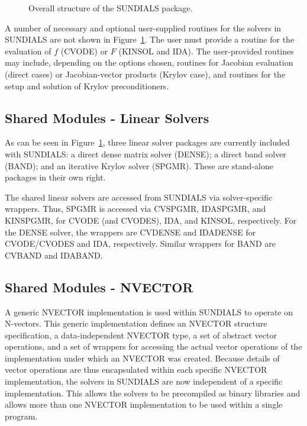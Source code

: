\begin{figure}[tp]
\centerline{}
\caption{Overall structure of the SUNDIALS  package.}
\label{fig-sunorg}
\end{figure}

A number of necessary and optional user-supplied routines for the solvers
in SUNDIALS
are not shown in \mbox{Figure \ref{fig-sunorg}}. The user must
provide a routine for the evaluation of $f$ (CVODE) or $F$ (KINSOL and
IDA). The user-provided routines may include, depending on the options
chosen, routines for Jacobian evaluation (direct cases) or Jacobian-vector
products (Krylov case), and routines for the setup and solution of Krylov
preconditioners.


\subsection{Shared Modules - Linear Solvers}

As can be seen in \mbox{Figure \ref{fig-sunorg}}, three linear solver
packages are currently included with SUNDIALS: a direct dense matrix solver
(DENSE); a direct band solver (BAND); and an iterative Krylov solver
(SPGMR). These are stand-alone packages in their own right.

The shared linear solvers are accessed from SUNDIALS via
solver-specific wrappers.
Thus, SPGMR is accessed via CVSPGMR, IDASPGMR, and
KINSPGMR, for CVODE (and CVODES), IDA, and KINSOL, respectively. For the
DENSE solver, the wrappers are CVDENSE and IDADENSE for CVODE/CVODES and
IDA, respectively. Similar wrappers for BAND are CVBAND and IDABAND.

\subsection{Shared Modules - NVECTOR}

A generic NVECTOR implementation is used within SUNDIALS to
operate on N-vectors. This generic implementation defines an NVECTOR
structure specification, a data-independent NVECTOR type, a set of abstract
vector operations, and a set of wrappers for accessing the actual vector
operations of the implementation under which an NVECTOR was created. Because
details of vector operations are thus encapsulated within each specific
NVECTOR implementation, the solvers in SUNDIALS
are now independent of a specific
implementation. This allows the solvers to be precompiled as binary
libraries and allows more than one NVECTOR implementation to be used within
a single program.

